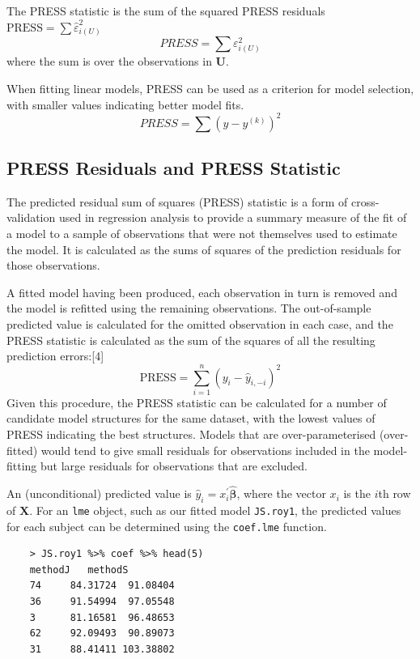 \documentclass[12pt, a4paper]{report}
\theoremstyle{plain}
\theoremstyle{definition}
\theoremstyle{remark}
\begin{document}
The PRESS statistic is the sum of the squared PRESS residuals
$\mbox{PRESS} = \sum \hat{\varepsilon}^2_{i(U)}$
\[ PRESS = \sum \varepsilon^2_{i(U)} \]
where the sum is over the observations in $\boldsymbol{U}$.


When fitting linear models, PRESS can be used as a criterion for model selection, with smaller values indicating better model fits.
\begin{equation}
PRESS = \sum(y-y^{(k)})^2
\end{equation}



\subsection{PRESS Residuals and PRESS Statistic}
The predicted residual sum of squares (PRESS) statistic is a form of cross-validation used in regression analysis to provide a summary measure of the fit of a model to a sample of observations that were not themselves used to estimate the model. It is calculated as the sums of squares of the prediction residuals for those observations.

A fitted model having been produced, each observation in turn is removed and the model is refitted using the remaining observations. The out-of-sample predicted value is calculated for the omitted observation in each case, and the PRESS statistic is calculated as the sum of the squares of all the resulting prediction errors:[4]
\[\mbox{PRESS} =\sum_{i=1}^n (y_i - \hat{y}_{i, -i})^2 \]
Given this procedure, the PRESS statistic can be calculated for a number of candidate model structures for the same dataset, with the lowest values of PRESS indicating the best structures. Models that are over-parameterised (over-fitted) would tend to give small residuals for observations included in the model-fitting but large residuals for observations that are excluded.

An (unconditional) predicted value is $\hat{y}_i = x^{\prime}_i \boldsymbol{\hat{\beta}}$, where 
the vector $x_i$ is the $i$th row of $\boldsymbol{X}$. For an \texttt{lme} object, such as our fitted model \texttt{JS.roy1}, the predicted values for each subject can be determined using the \texttt{coef.lme} function.
\begin{framed}
	\begin{verbatim}
	> JS.roy1 %>% coef %>% head(5)
	methodJ   methodS
	74     84.31724  91.08404
	36     91.54994  97.05548
	3      81.16581  96.48653
	62     92.09493  90.89073
	31     88.41411 103.38802
	\end{verbatim}
\end{framed}
\end{document}

